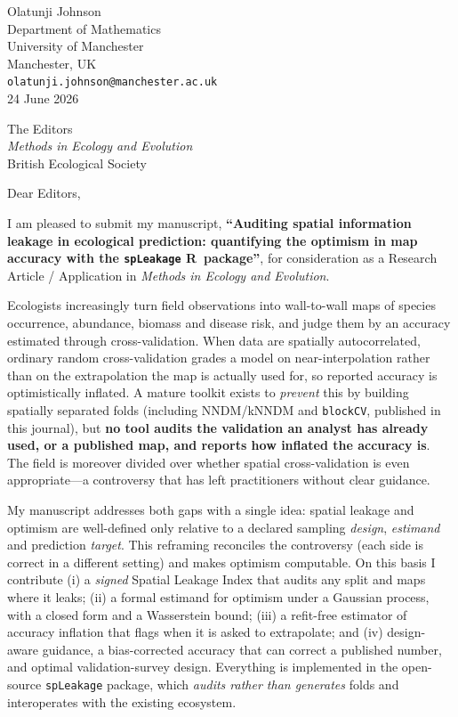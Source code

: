 \documentclass[11pt,a4paper]{article}
\begin{document}
\noindent\begin{flushright}
Olatunji Johnson\\
Department of Mathematics\\
University of Manchester\\
Manchester, UK\\
\texttt{olatunji.johnson@manchester.ac.uk}\\
24 June 2026
\end{flushright}

\noindent The Editors\\
\emph{Methods in Ecology and Evolution}\\
British Ecological Society

\medskip
\noindent Dear Editors,

I am pleased to submit my manuscript, \textbf{``Auditing spatial information leakage
in ecological prediction: quantifying the optimism in map accuracy with the
\texttt{spLeakage} R~package''}, for consideration as a Research Article / Application
in \emph{Methods in Ecology and Evolution}.

Ecologists increasingly turn field observations into wall-to-wall maps of species
occurrence, abundance, biomass and disease risk, and judge them by an accuracy
estimated through cross-validation. When data are spatially autocorrelated, ordinary
random cross-validation grades a model on near-interpolation rather than on the
extrapolation the map is actually used for, so reported accuracy is optimistically
inflated. A mature toolkit exists to \emph{prevent} this by building spatially
separated folds (including NNDM/kNNDM and \texttt{blockCV}, published in this
journal), but \textbf{no tool audits the validation an analyst has already used, or a
published map, and reports how inflated the accuracy is}. The field is moreover
divided over whether spatial cross-validation is even appropriate---a controversy
that has left practitioners without clear guidance.

My manuscript addresses both gaps with a single idea: spatial leakage and optimism
are well-defined only relative to a declared sampling \emph{design}, \emph{estimand}
and prediction \emph{target}. This reframing reconciles the controversy (each side is
correct in a different setting) and makes optimism computable. On this basis I
contribute (i) a \emph{signed} Spatial Leakage Index that audits any split and maps
where it leaks; (ii) a formal estimand for optimism under a Gaussian process, with a
closed form and a Wasserstein bound; (iii) a refit-free estimator of accuracy
inflation that flags when it is asked to extrapolate; and (iv) design-aware guidance,
a bias-corrected accuracy that can correct a published number, and optimal
validation-survey design. Everything is implemented in the open-source
\texttt{spLeakage} package, which \emph{audits rather than generates} folds and
interoperates with the existing ecosystem.
\end{document}
